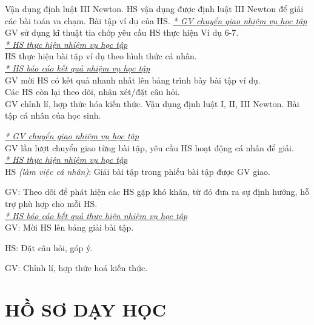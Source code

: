 \hoatdong
{Vận dụng định luật III Newton.
}
{HS vận dụng được định luật III Newton để giải các bài toán va chạm.
}
{Bài tập ví dụ của HS.
}
{\textit{\underline{* GV chuyển giao nhiệm vụ học tập}}\\
	GV sử dụng kĩ thuật tia chớp yêu cầu HS thực hiện Ví dụ 6-7.\\
	\textit{\underline{* HS thực hiện nhiệm vụ học tập}}\\
	HS thực hiện bài tập ví dụ theo hình thức cá nhân.\\
	\textit{\underline{* HS báo cáo kết quả nhiệm vụ học tập}}\\
	GV mời HS có kết quả nhanh nhất lên bảng trình bày bài tập ví dụ.\\
	Các HS còn lại theo dõi, nhận xét/đặt câu hỏi.\\
	GV chỉnh lí, hợp thức hóa kiến thức.
}
{
	Vận dụng định luật I, II, III Newton.
}
{
	Bài tập cá nhân của học sinh.
}
{
	\textit{\underline{* GV chuyển giao nhiệm vụ học tập}}\\
	GV lần lượt chuyển giao từng bài tập, yêu cầu HS hoạt động cá nhân để giải.\\
	\textit{\underline{* HS thực hiện nhiệm vụ học tập}}\\
	HS \textit{(làm việc cá nhân)}:  Giải bài tập trong phiếu bài tập được GV giao. 
	
	GV: Theo dõi để phát hiện các HS gặp khó khăn, từ đó đưa ra sự định hướng, hỗ trợ phù hợp cho mỗi HS.\\
	\textit{\underline{* HS báo cáo kết quả thực hiện nhiệm vụ học tập}}\\
	GV: Mời HS lên bảng giải bài tập.
	
	HS: Đặt câu hỏi, góp ý.
	
	GV: Chỉnh lí, hợp thức hoá kiến thức.
}
\section{HỒ SƠ DẠY HỌC}
